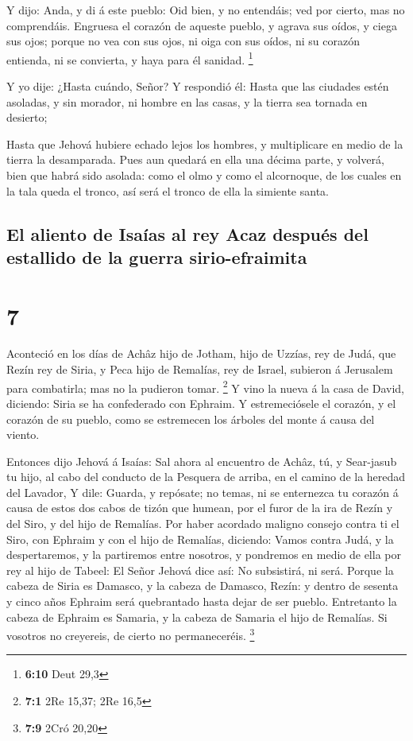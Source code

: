  Y dijo: Anda, y di á este pueblo: Oid bien, y no
entendáis; ved por cierto, mas no comprendáis.  Engruesa
el corazón de aqueste pueblo, y agrava sus oídos, y ciega sus ojos;
porque no vea con sus ojos, ni oiga con sus oídos, ni su corazón
entienda, ni se convierta, y haya para él sanidad. \footnote{\textbf{6:10}
  Deut 29,3}

 Y yo dije: ¿Hasta cuándo, Señor? Y respondió él: Hasta
que las ciudades estén asoladas, y sin morador, ni hombre en las casas,
y la tierra sea tornada en desierto;

 Hasta que Jehová hubiere echado lejos los hombres, y
multiplicare en medio de la tierra la desamparada.  Pues
aun quedará en ella una décima parte, y volverá, bien que habrá sido
asolada: como el olmo y como el alcornoque, de los cuales en la tala
queda el tronco, así será el tronco de ella la simiente santa.

\hypertarget{el-aliento-de-isauxedas-al-rey-acaz-despuuxe9s-del-estallido-de-la-guerra-sirio-efraimita}{%
\subsection{El aliento de Isaías al rey Acaz después del estallido de la
guerra
sirio-efraimita}\label{el-aliento-de-isauxedas-al-rey-acaz-despuuxe9s-del-estallido-de-la-guerra-sirio-efraimita}}

\hypertarget{section-6}{%
\section{7}\label{section-6}}

 Aconteció en los días de Achâz hijo de Jotham, hijo de
Uzzías, rey de Judá, que Rezín rey de Siria, y Peca hijo de Remalías,
rey de Israel, subieron á Jerusalem para combatirla; mas no la pudieron
tomar. \footnote{\textbf{7:1} 2Re 15,37; 2Re 16,5}  Y vino
la nueva á la casa de David, diciendo: Siria se ha confederado con
Ephraim. Y estremeciósele el corazón, y el corazón de su pueblo, como se
estremecen los árboles del monte á causa del viento.

 Entonces dijo Jehová á Isaías: Sal ahora al encuentro de
Achâz, tú, y Sear-jasub tu hijo, al cabo del conducto de la Pesquera de
arriba, en el camino de la heredad del Lavador,  Y dile:
Guarda, y repósate; no temas, ni se enternezca tu corazón á causa de
estos dos cabos de tizón que humean, por el furor de la ira de Rezín y
del Siro, y del hijo de Remalías.  Por haber acordado
maligno consejo contra ti el Siro, con Ephraim y con el hijo de
Remalías, diciendo:  Vamos contra Judá, y la
despertaremos, y la partiremos entre nosotros, y pondremos en medio de
ella por rey al hijo de Tabeel:  El Señor Jehová dice así:
No subsistirá, ni será.  Porque la cabeza de Siria es
Damasco, y la cabeza de Damasco, Rezín: y dentro de sesenta y cinco años
Ephraim será quebrantado hasta dejar de ser pueblo. 
Entretanto la cabeza de Ephraim es Samaria, y la cabeza de Samaria el
hijo de Remalías. Si vosotros no creyereis, de cierto no permaneceréis.
\footnote{\textbf{7:9} 2Cró 20,20}

